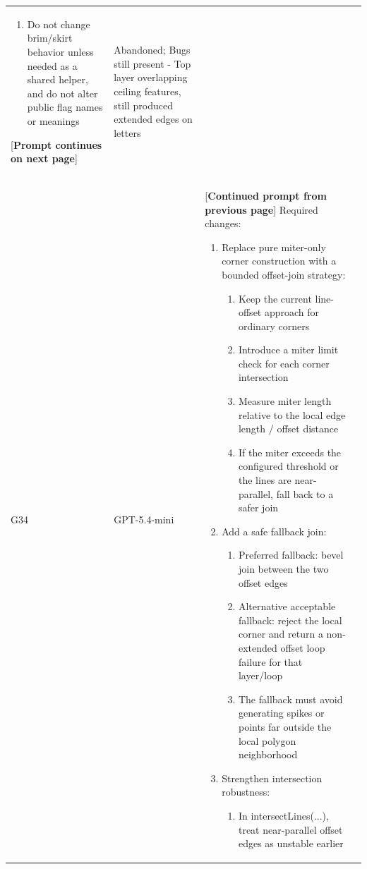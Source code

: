 \documentclass[10pt,twocolumn,a4paper]{article}
\begin{document}
\begin{longtable}{@{}p{0.6cm}p{1.5cm}p{11.0cm}p{2.7cm}@{}}
\begin{enumerate}
	\begin{enumerate}
		\item{emitOuterWalls(...)}
		\item{offsetPolygon(...)}
		\item{intersectLines(...)}
		\item{isReasonableOffsetVertex(...)}
	\end{enumerate}
	\item{Do not change brim/skirt behavior unless needed as a shared helper, and do not alter public flag names or meanings} 
\end{enumerate}
[\textbf{Prompt continues on next page}] & Abandoned; Bugs still present - Top layer overlapping ceiling features, still produced extended edges on letters \\
\addlinespace
G34 & GPT-5.4-mini & [\textbf{Continued prompt from previous page}] \newline
Required changes:		
\begin{enumerate}
	\item{Replace pure miter-only corner construction with a bounded offset-join strategy:}
	\begin{enumerate}
		\item{Keep the current line-offset approach for ordinary corners}
		\item{Introduce a miter limit check for each corner intersection}
		\item{Measure miter length relative to the local edge length / offset distance}
		\item{If the miter exceeds the configured threshold or the lines are near-parallel, fall back to a safer join}
	\end{enumerate}
	\item{Add a safe fallback join:}
	\begin{enumerate}
		\item{Preferred fallback: bevel join between the two offset edges}
		\item{Alternative acceptable fallback: reject the local corner and return a non-extended offset loop failure for that layer/loop}
		\item{The fallback must avoid generating spikes or points far outside the local polygon neighborhood}
	\end{enumerate}
	\item{Strengthen intersection robustness:}
	\begin{enumerate}
		\item{In intersectLines(...), treat near-parallel offset edges as unstable earlier}

\end{enumerate}
\end{enumerate}
\end{longtable}
\end{document}
